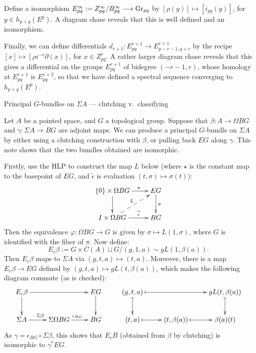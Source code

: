 \documentclass[11pt]{article}
\newcommand{\Gr}{\textup{Gr}}
\renewcommand{\phi}{\varphi}
\theoremstyle{plain}
\theoremstyle{definition}
\renewcommand{\to}{\longrightarrow}
\renewcommand{\mapsto}{\longmapsto}
\newcommand{\myheading}[1]%
{{\noindent\Large #1}

}
\begin{document}
Define a isomorphism $E^\infty_{pq}:=Z_{pq}^\infty/B_{pq}^\infty\to \Gr_{pq}$
by $[\rho(y)]\mapsto[i_{pq}(y)]$, for $y\in h_{p+q}(E^p)$. A diagram chase reveals that this is well defined and an isomorphism.

Finally, we can define differentials $d_{r+1}:E^{r+1}_{pq}\to E^{r+1}_{p-r-1,q+r}$ by the recipe $[x]\mapsto [\rho i^{-r}\partial(x)]$, for $x\in Z_{pq}^{r}$. A rather larger diagram chase reveals that this gives a differential on the groups $E^{r+1}_{pq}$ of bidegree $(-r-1,r)$, whose homology at $E^{r+1}_{pq}$ is $E^{r+2}_{pq}$, so that we have defined a spectral sequence converging to $h_{p+q}(E^p)$.

\pagebreak

\myheading{Principal $G$-bundles on $\Sigma A$ --- clutching v.\ classifying}
Let $A$ be a pointed space, and $G$ a topological group. Suppose that $\beta:A\to \Omega BG$ and $\gamma:\Sigma A\to BG$ are adjoint maps. We can produce a principal $G$-bundle on $\Sigma A$ by either using a clutching construction with $\beta$, or pulling back $EG$ along $\gamma$. This note shows that the two bundles obtained are isomorphic.

Firstly, use the HLP to construct the map $L$ below (where $\star$ is the constant map to the basepoint of $EG$, and $\widetilde\epsilon$ is evaluation $(t,\sigma)\mapsto \sigma(t)$):
\[\xymatrix{
\{0\}\times\Omega BG\ar[r]^{\ \ \ \ \star}\ar[d]&EG\ar[d]^{\pi}\\
I\times\Omega BG\ar[r]^{\ \ \ \ \widetilde\epsilon}\ar@{-->}[ru]^L&BG
}\]
Then the equivalence $\phi:\Omega BG\to G$ is given by $\sigma\mapsto L(1,\sigma)$, where $G$ is identified with the fiber of $\pi$. Now define:
\[E_c\beta:=G\times C(A)\sqcup G / (g,1,a)\sim gL(1,\beta(a)).\]
Then $E_c\beta$ maps to $\Sigma A$ via $(g,t,a)\mapsto(t,a)$. Moreover, there is a map $E_c\beta\to EG$ defined by $(g,t,a)\mapsto gL(t,\beta(a))$, which makes the following diagram commute (as is checked): 
\[\xymatrix{
E_c\beta\ar[rr]\ar[d]&&EG\ar[d]&
(g,t,a)\ar@{|->}[rr]\ar@{|->}[d]&&gL(t,\beta(a))\ar@{|->}[d]\\
\Sigma A\ar[r]^{\Sigma\beta}&\Sigma\Omega BG\ar[r]^{\epsilon_{BG}}&BG&
(t,a)\ar@{|->}[r]&(t,\beta(a))\ar@{|->}[r]&\beta(a)(t)
}\]
As $\gamma=\epsilon_{BG}\circ\Sigma\beta$, this shows that $E_cB$ (obtained from $\beta$ by clutching) is isomorphic to $\gamma^*EG$.
\pagebreak
\end{document}
